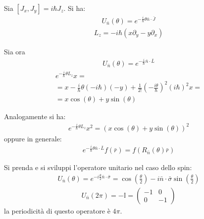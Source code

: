 Sia $\left[J_x,J_y\right]=i\hbar J_z$. Si ha:
\begin{equation}\begin{split}
U_{\bar n}\left(\theta\right)=e^{-\frac{i}{\hbar }\theta \bar n\cdot \bar J}
\end{split}\end{equation}
\begin{equation}\begin{split}
L_z=-i\hbar \left(x\partial _y-y\partial _x\right)
\end{split}\end{equation}

Sia ora
\begin{equation}\begin{split}
U_{\bar n}\left(\theta\right)=e^{-\frac{i}{\hbar }\bar n\cdot \bar L}
\end{split}\end{equation}
\begin{equation}\begin{split}
e^{-\frac{i}{\hbar }\theta L_z}x=\\
=x-\frac{i}{\hbar }\theta\left(-i\hbar \right)\left(-y\right)+\frac{1}{2!}\left(-\frac{i\theta}{\hbar }\right)^2\left(i\hbar \right)^2x=\\
=x\cos{\left(\theta\right)}+y\sin{\left(\theta\right)}
\end{split}\end{equation}

Analogamente si ha:
\begin{equation}\begin{split}
e^{-\frac{i}{\hbar }\theta L_z}x^2=\left(x\cos{\left(\theta\right)}+y\sin{\left(\theta\right)}\right)^2
\end{split}\end{equation}
oppure in generale:
\begin{equation}\begin{split}
e^{-\frac{i}{\hbar }\theta \bar n\cdot \bar L}f\left(\bar r\right)=f\left(R_{\bar n}\left(\theta\right)\bar r\right)
\end{split}\end{equation}


Si prenda e si sviluppi l'operatore unitario nel caso dello spin:
\begin{equation}\begin{split}
U_{\bar n}\left(\theta\right)=e^{-i\frac{\theta}{2}\bar n\cdot \bar \sigma}=\cos{\left(\frac{\theta}{2}\right)}-i\bar n\cdot \bar \sigma \sin{\left(\frac{\theta}{2}\right)}
\end{split}\end{equation}
\begin{equation}\begin{split}
U_{\bar n}\left(2\pi\right)=-\mathbb{I}=\left(\begin{matrix}-1 & 0\\0 & -1\end{matrix}\right)
\end{split}\end{equation}
la periodicità di questo operatore è $4\pi$.

